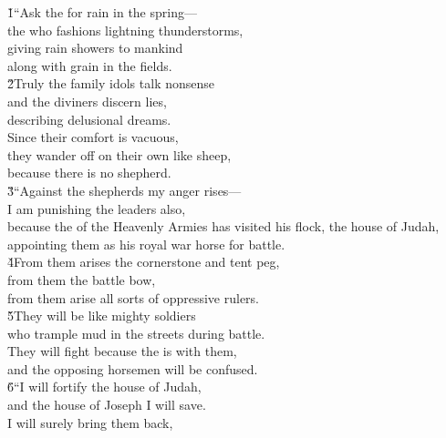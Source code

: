 \begin{poetry}
\poeml {}
\v{1}``Ask the  for rain in the spring--- \\
\poemll    the  who fashions lightning thunderstorms, \\
\poeml giving rain showers to mankind \\
\poemll    along with grain in the fields. \\
\poeml \v{2}Truly the family idols talk nonsense \\
\poemll    and the diviners discern lies, \\
\poemlll       describing delusional dreams. \\
\poeml Since their comfort is vacuous, \\
\poemll    they wander off on their own like sheep, \\
\poemlll       because there is no shepherd. \\
\poeml \v{3}``Against the shepherds my anger rises--- \\
\poemll    I am punishing the leaders also, \\
\poeml because the  of the Heavenly Armies has visited his flock, the house of Judah, \\
\poemll    appointing them as his royal war horse for battle. \\
\poeml \v{4}From them arises the cornerstone and tent peg, \\
\poemll    from them the battle bow, \\
\poemlll       from them arise all sorts of oppressive rulers. \\
\poeml \v{5}They will be like mighty soldiers \\
\poemll    who trample mud in the streets during battle. \\
\poeml They will fight because the  is with them, \\
\poemll    and the opposing horsemen will be confused. \\
\poeml \v{6}``I will fortify the house of Judah, \\
\poemll    and the house of Joseph I will save. \\
\poeml I will surely bring them back, \\

\end{poetry}
